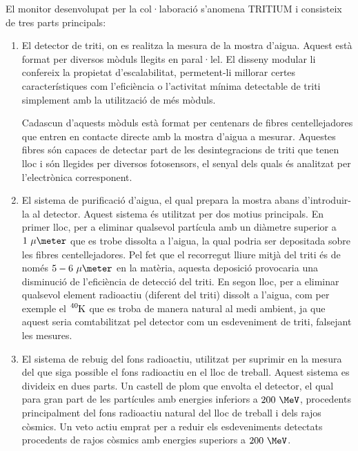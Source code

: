 El monitor desenvolupat per la col·laboració s'anomena TRITIUM i consisteix de tres parts principals:

\begin{enumerate}

\item{} El detector de triti, on es realitza la mesura de la mostra d'aigua. Aquest està format per diversos mòduls llegits en paral·lel. El disseny modular li confereix la propietat d'escalabilitat, permetent-li millorar certes característiques com l'eficiència o l'activitat mínima detectable de triti simplement amb la utilització de més mòduls.

Cadascun d'aquests mòduls està format per centenars de fibres centellejadores que entren en contacte directe amb la mostra d'aigua a mesurar. Aquestes fibres són capaces de detectar part de les desintegracions de triti que tenen lloc i són llegides per diversos fotosensors, el senyal dels quals és analitzat per l'electrònica corresponent.

\item{} El sistema de purificació d'aigua, el qual prepara la mostra abans d'introduir-la al detector. Aquest sistema és utilitzat per dos motius principals. En primer lloc, per a eliminar qualsevol partícula amb un diàmetre superior a $1~\mu\meter$ que es trobe dissolta a l'aigua, la qual podria ser depositada sobre les fibres centellejadores. Pel fet que el recorregut lliure mitjà del triti és de només $5-6~\mu\meter$ en la matèria, aquesta deposició provocaria una disminució de l'eficiència de detecció del triti. En segon lloc, per a eliminar qualsevol element radioactiu (diferent del triti) dissolt a l'aigua, com per exemple el $\ce{^{40}K}$ que es troba de manera natural al medi ambient, ja que aquest seria comtabilitzat pel detector com un esdeveniment de triti, falsejant les mesures.

\item{} El sistema de rebuig del fons radioactiu, utilitzat per suprimir en la mesura del que siga possible el fons radioactiu en el lloc de treball. Aquest sistema es divideix en dues parts. Un castell de plom que envolta el detector, el qual para gran part de les partícules amb energies inferiors a $200~\MeV$, procedents principalment del fons radioactiu natural del lloc de treball i dels rajos còsmics. Un veto actiu emprat per a reduir els esdeveniments detectats procedents de rajos còsmics amb energies superiors a $200~\MeV$.

\end{enumerate}


